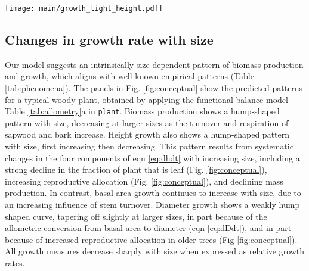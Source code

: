 \documentclass[9pt,twocolumn,twoside,lineno]{pnas-new}
\newcommand{\plant}{\texttt{plant}}
\begin{document}
\begin{SCfigure*}[\sidecaptionrelwidth][!ht]
\centering
\texttt{[image: main/growth\_light\_height.pdf]}
\caption{\textbf{Effect of four traits on height growth rate for different-sized plants.}
Growth rates were simulated using the {\plant} model, applying the trade-offs describing in Table \ref{tab:traits}. Each panel shows how growth is influenced by a different trait for plants of a given height, and across a series of canopy openness values from completely open (light blue,  $E=1$) to heavily shaded (dark line, $E=0.25$). For any given value of trait and $E$, plants were grown to the desired height and their growth rate estimated. The white regions indicate trait ranges that are typically observed in real systems. Figs. \ref{fig:growth_light_dia}-\ref{fig:growth_light_mass} show similar plots but with growth measured as stem diameter, stem area, or plant mass. Changes in trait-growth relationships are summarised in Table \ref{tab:responses}.
\label{fig:growth_light_height}}
\end{SCfigure*}

\subsection{Changes in growth rate with size}

Our model suggests an intrinsically size-dependent pattern of biomass-production and growth, which aligns with well-known empirical patterns (Table \ref{tab:phenomena}). The panels in Fig. \ref{fig:conceptual} show the predicted patterns for a typical woody plant, obtained by applying the functional-balance model Table \ref{tab:allometry}a in {\plant}. Biomass production shows a hump-shaped pattern with size, decreasing at larger sizes as the turnover and respiration of sapwood and bark increase. Height growth also shows a hump-shaped pattern with size, first increasing then decreasing. This pattern results from systematic changes in the four components of eqn \ref{eq:dhdt} with increasing size, including a strong decline in the fraction of plant that is leaf (Fig. \ref{fig:conceptual}), increasing reproductive allocation (Fig. \ref{fig:conceptual}), and declining mass production. In contrast, basal-area growth continues to increase with size, due to an increasing influence of stem turnover. Diameter growth shows a weakly hump shaped curve, tapering off slightly at larger sizes, in part because of the allometric conversion from basal area to diameter (eqn \ref{eq:dDdt}), and in part because of increased reproductive allocation in older trees (Fig \ref{fig:conceptual}). All growth measures decrease sharply with size when expressed as relative growth rates.
\end{document}
